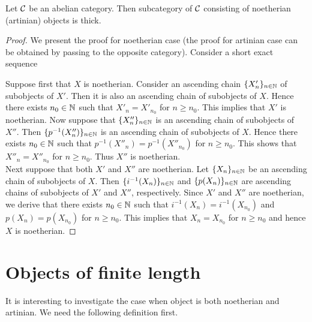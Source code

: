 \begin{proposition}\label{proposition:noetherian_and_artinian_is_thick}
Let ${\mathcal C}$ be an abelian category. Then subcategory of ${\mathcal C}$ consisting of noetherian (artinian) objects is thick.
\end{proposition}
\begin{proof}
We present the proof for noetherian case (the proof for artinian case can be obtained by passing to the opposite category). Consider a short exact sequence
\begin{center}
\end{center}
Suppose first that $X$ is noetherian. Consider an ascending chain $\{X'_n\}_{n\in {\mathbb N}}$ of subobjects of $X'$. Then it is also an ascending chain of subobjects of $X$. Hence there exists $n_0\in {\mathbb N}$ such that $X'_n = X'_{n_0}$ for $n\geq n_0$. This implies that $X'$ is noetherian. Now suppose that $\{X''_n\}_{n\in {\mathbb N}}$ is an ascending chain of subobjects of $X''$. Then $\{p^{-1}(X''_n)\}_{n\in {\mathbb N}}$ is an ascending chain of subobjects of $X$. Hence there exists $n_0\in {\mathbb N}$ such that $p^{-1}(X''_n) = p^{-1}(X''_{n_0})$ for $n\geq n_0$. This shows that $X''_n = X''_{n_0}$ for $n\geq n_0$. Thus $X''$ is noetherian.\\
Next suppose that both $X'$ and $X''$ are noetherian. Let $\{X_n\}_{n\in {\mathbb N}}$ be an ascending chain of subobjects of $X$. Then $\{i^{-1}(X_n)\}_{n\in {\mathbb N}}$ and $\{p(X_n)\}_{n\in {\mathbb N}}$ are ascending chains of subobjects of $X'$ and $X''$, respectively. Since $X'$ and $X''$ are noetherian, we derive that there exists $n_0\in {\mathbb N}$ such that $i^{-1}(X_n) = i^{-1}(X_{n_0})$ and $p(X_n) = p(X_{n_0})$ for $n\geq n_0$. This implies that $X_n = X_{n_0}$ for $n\geq n_0$ and hence $X$ is noetherian.
\end{proof}

\section{Objects of finite length}
It is interesting to investigate the case when object is both noetherian and artinian. We need the following definition first.

